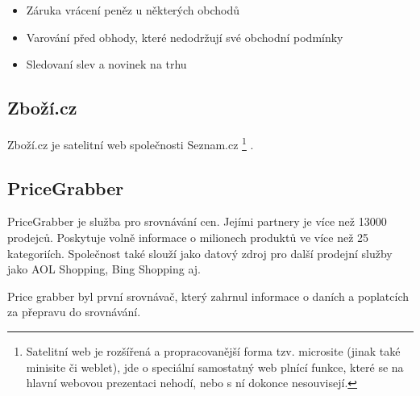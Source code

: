 \begin{itemize}
\item Záruka vrácení peněz u některých obchodů
\item Varování před obhody, které nedodržují své obchodní podmínky
\item Sledovaní slev a novinek na trhu
\end{itemize}
\subsection{Zboží.cz}
Zboží.cz je satelitní web společnosti Seznam.cz
\footnote{Satelitní web je rozšířená a propracovanější forma tzv. microsite (jinak také minisite či weblet), jde o speciální samostatný web plnící funkce, které se na hlavní webovou prezentaci nehodí, nebo s ní dokonce nesouvisejí.}
. 


\subsection{PriceGrabber}
PriceGrabber je služba pro srovnávání cen. Jejími partnery je více než 13000 prodejců. Poskytuje volně informace o milionech produktů ve více než 25 kategoriích. Společnost také slouží jako datový zdroj pro další prodejní služby jako AOL Shopping, Bing Shopping aj. \cite{website:wiki:pricegrabber}

Price grabber byl první srovnávač, který zahrnul informace o daních a poplatcích za přepravu do srovnávání. \cite{website:wiki:pricegrabber}